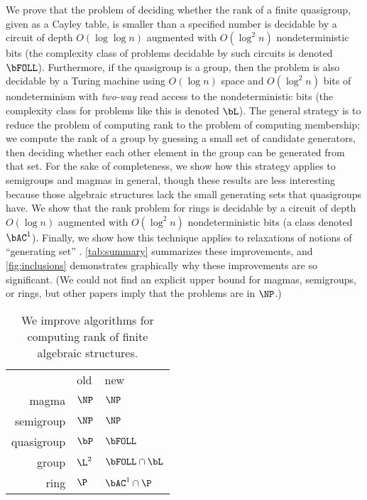 %
We prove that the problem of deciding whether the rank of a finite quasigroup, given as a Cayley table, is smaller than a specified number is decidable by a circuit of depth $O(\log \log n)$ augmented with $O(\log^2 n)$ nondeterministic bits (the complexity class of problems decidable by such circuits is denoted $\bFOLL$).
Furthermore, if the quasigroup is a group, then the problem is also decidable by a Turing machine using $O(\log n)$ space and $O(\log^2 n)$ bits of nondeterminism with \emph{two-way} read access to the nondeterministic bits (the complexity class for problems like this is denoted $\bL$).
The general strategy is to reduce the problem of computing rank to the problem of computing membership; we compute the rank of a group by guessing a small set of candidate generators, then deciding whether each other element in the group can be generated from that set.
For the sake of completeness, we show how this strategy applies to semigroups and magmas in general, though these results are less interesting because those algebraic structures lack the small generating sets that quasigroups have.
We show that the rank problem for rings is decidable by a circuit of depth $O(\log n)$ augmented with $O(\log^2 n)$ nondeterministic bits (a class denoted $\bAC^1$).
Finally, we show how this technique applies to relaxations of notions of ``generating set'' .
\autoref{tab:summary} summarizes these improvements, and \autoref{fig:inclusions} demonstrates graphically why these improvements are so significant.
(We could not find an explicit upper bound for magmas, semigroups, or rings, but other papers imply that the problems are in $\NP$.)
\begin{table}
  \caption{\label{tab:summary}We improve algorithms for computing rank of finite algebraic structures.}
  \begin{center}
    \begin{tabular}{r l l}
      & old & new \\[5pt]
      magma & $\NP$ & $\NP$ \\
      semigroup & $\NP$ & $\NP$ \\
      quasigroup & $\bP$ \autocite{py96} & $\bFOLL$ \\
      group & $\L^2$ \autocite{lsz77} & $\bFOLL \cap \bL$ \\
      ring & $\P$ & $\bAC^1 \cap \P$
    \end{tabular}
  \end{center}
\end{table}

